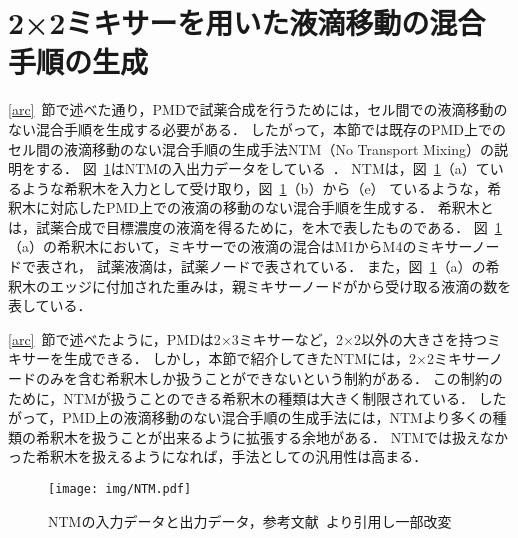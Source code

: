 \section{{2×2ミキサーを用いた液滴移動の混合手順の生成}}
\ref{arc}~節で述べた通り，PMDで試薬合成を行うためには，セル間での液滴移動のない混合手順を生成する必要がある．
したがって，本節では既存のPMD上でのセル間の液滴移動のない混合手順の生成手法NTM（No Transport Mixing）の説明をする．
図~\ref{fig:ntmresult}はNTMの入出力データをしている~\cite{4}．
NTMは，図~\ref{fig:ntmresult}（a）ているような希釈木を入力として受け取り，図~\ref{fig:ntmresult}（b）から（e）
ているような，希釈木に対応したPMD上での液滴の移動のない混合手順を生成する．
希釈木とは，試薬合成で目標濃度の液滴を得るために，を木で表したものである．
図~\ref{fig:ntmresult}（a）の希釈木において，ミキサーでの液滴の混合はM1からM4のミキサーノードで表され，
試薬液滴は，試薬ノードで表されている．
また，図~\ref{fig:ntmresult}（a）の希釈木のエッジに付加された重みは，親ミキサーノードがから受け取る液滴の数を表している．

\ref{arc}~節で述べたように，PMDは2$\times$3ミキサーなど，2$\times$2以外の大きさを持つミキサーを生成できる．
しかし，本節で紹介してきたNTMには，2$\times$2ミキサーノードのみを含む希釈木しか扱うことができないという制約がある．
この制約のために，NTMが扱うことのできる希釈木の種類は大きく制限されている．
したがって，PMD上の液滴移動のない混合手順の生成手法には，NTMより多くの種類の希釈木を扱うことが出来るように拡張する余地がある．
NTMでは扱えなかった希釈木を扱えるようになれば，手法としての汎用性は高まる．
\begin{figure}[tbp]
 \centering\texttt{[image: img/NTM.pdf]}
    \caption{NTMの入力データと出力データ，参考文献~\cite{4}より引用し一部改変}\label{fig:ntmresult}
\end{figure}

